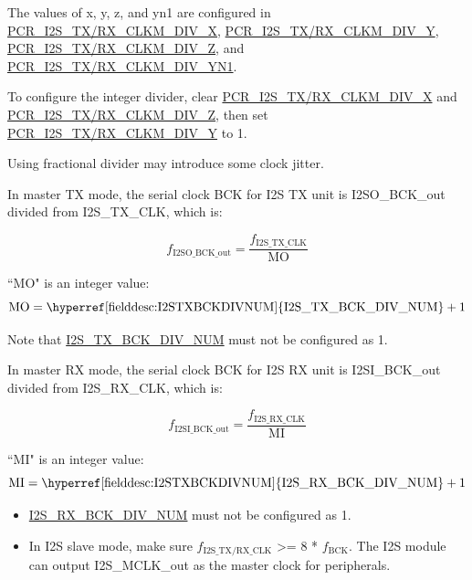 \documentclass[main\_\_EN.tex]{subfiles}
\begin{document}
The values of x, y, z, and yn1 are configured in \hyperref[fielddesc:PCRI2STXCLKMDIVX]{PCR\_I2S\_TX/RX\_CLKM\_DIV\_X}, \hyperref[fielddesc:PCRI2STXCLKMDIVY]{PCR\_I2S\_TX/RX\_CLKM\_DIV\_Y}, \hyperref[fielddesc:PCRI2STXCLKMDIVZ]{PCR\_I2S\_TX/RX\_CLKM\_DIV\_Z}, and \hyperref[fielddesc:PCRI2STXCLKMDIVYN1]{PCR\_I2S\_TX/RX\_CLKM\_DIV\_YN1}.

To configure the integer divider, clear \hyperref[fielddesc:PCRI2STXCLKMDIVX]{PCR\_I2S\_TX/RX\_CLKM\_DIV\_X} and \hyperref[fielddesc:PCRI2STXCLKMDIVZ]{PCR\_I2S\_TX/RX\_CLKM\_DIV\_Z}, then set \hyperref[fielddesc:PCRI2STXCLKMDIVY]{PCR\_I2S\_TX/RX\_CLKM\_DIV\_Y} to 1.

\begin{tiplisting}
Using fractional divider may introduce some clock jitter.
\end{tiplisting}

In master TX mode, the serial clock BCK for I2S TX unit is I2SO\_BCK\_out divided from I2S\_TX\_CLK, which is:

$$f_{\textrm{I2SO\_BCK\_out}} = \frac{f_{\textrm{I2S\_TX\_CLK}}}{\textrm{MO}}$$

``MO" is an integer value:
$$ \textrm{MO} = \textrm{\hyperref[fielddesc:I2STXBCKDIVNUM]{I2S\_TX\_BCK\_DIV\_NUM}} + 1 $$

\vspace{-1em}
\begin{tiplisting}
Note that \hyperref[fielddesc:I2STXBCKDIVNUM]{I2S\_TX\_BCK\_DIV\_NUM} must not be configured as 1.
\end{tiplisting}

In master RX mode, the serial clock BCK for I2S RX unit is I2SI\_BCK\_out divided from I2S\_RX\_CLK, which is:

$$f_{\textrm{I2SI\_BCK\_out}} = \frac{f_{\textrm{I2S\_RX\_CLK}}}{\textrm{MI}}$$

``MI" is an integer value:
$$ \textrm{MI} = \textrm{\hyperref[fielddesc:I2STXBCKDIVNUM]{I2S\_RX\_BCK\_DIV\_NUM}} + 1 $$

\begin{tiplisting}
\vspace{-2em}
\begin{itemize}
    \item \hyperref[fielddesc:I2SRXBCKDIVNUM]{I2S\_RX\_BCK\_DIV\_NUM} must not be configured as 1.
    \item In I2S slave mode, make sure $f_{\textrm{I2S\_TX/RX\_CLK}}$ >= 8 * $f_{\textrm{BCK}}$. The I2S module can output I2S\_MCLK\_out as the master clock for peripherals.
\end{itemize}
\end{tiplisting}
\end{document}
